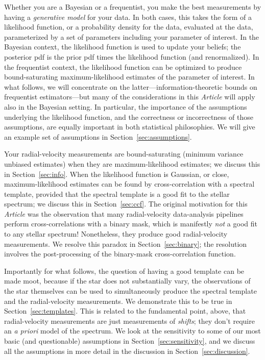 \documentclass[modern]{aastex631}
\newcommand{\documentname}{\textsl{Article}}
\newcommand{\sectionname}{Section}
\newcommand{\secref}[1]{\sectionname~\ref{#1}}
\newcommand{\foreign}[1]{\textsl{#1}}
\begin{document}
Whether you are a Bayesian or a frequentist, you make the best measurements by having a \emph{generative model} for your data.
In both cases, this takes the form of a likelihood function, or a probability density for the data, evaluated at the data, parameterized by a set of parameters including your parameter of interest.
In the Bayesian context, the likelihood function is used to update your beliefs; the posterior pdf is the prior pdf times the likelihood function (and renormalized).
In the frequentist context, the likelihood function can be optimized to produce bound-saturating maximum-likelihood estimates of the parameter of interest.
In what follows, we will concentrate on the latter---information-theoretic bounds on frequentist estimators---but many of the considerations in this \documentname{} will apply also in the Bayesian setting.
In particular, the importance of the assumptions underlying the likelihood function, and the correctness or incorrectness of those assumptions, are equally important in both statistical philosophies.
We will give an example set of assumptions in \secref{sec:assumptions}.

Your radial-velocity measurements are bound-saturating (minimum variance unbiased estimates) when they are maximum-likelihood estimates; we discuss this in \secref{sec:info}.
When the likelihood function is Gaussian, or close, maximum-likelihood estimates can be found by cross-correlation with a spectral template, provided that the spectral template is a good fit to the stellar spectrum; we discuss this in \secref{sec:ccf}.
The original motivation for this \documentname{} was the observation that many radial-velocity data-analysis pipelines perform cross-correlations with a binary mask, which is manifestly \emph{not} a good fit to any stellar spectrum!
Nonetheless, they produce good radial-velocity measurements.
We resolve this paradox in \secref{sec:binary}; the resolution involves the post-processing of the binary-mask cross-correlation function.

Importantly for what follows, the question of having a good template can be made moot, because if the star does not substantially vary, the observations of the star themselves can be used to simultaneously produce the spectral template and the radial-velocity measurements.
We demonstrate this to be true in \secref{sec:templates}.
This is related to the fundamental point, above, that radial-velocity measurements are just measurements of \emph{shifts}; they don't require an \foreign{a priori} model of the spectrum.
We look at the sensitivity to some of our most basic (and questionable) assumptions in \secref{sec:sensitivity}, and we discuss all the assumptions in more detail in the discussion in \secref{sec:discussion}.
\end{document}
